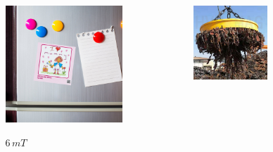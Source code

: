 \documentclass[handout]{beamer}
\theoremstyle{plain}
\begin{document}
\begin{frame}
\begin{columns}
\begin{column}{0.3\textwidth}
\begin{figure}
    $ 0,050 \, mT $
  \end{figure}    
  \end{column}
  \begin{column}{0.3\textwidth}
  \begin{figure}
    \includegraphics[width=\columnwidth]{img/frigo.jpg}

    $ 6 \, mT $
  \end{figure}    
  \end{column}
  \begin{column}{0.3\textwidth}
  \begin{figure}
    \includegraphics[width=\columnwidth]{img/scrap.jpg}


\end{figure}
\end{column}
\end{columns}
\end{frame}
\end{document}
